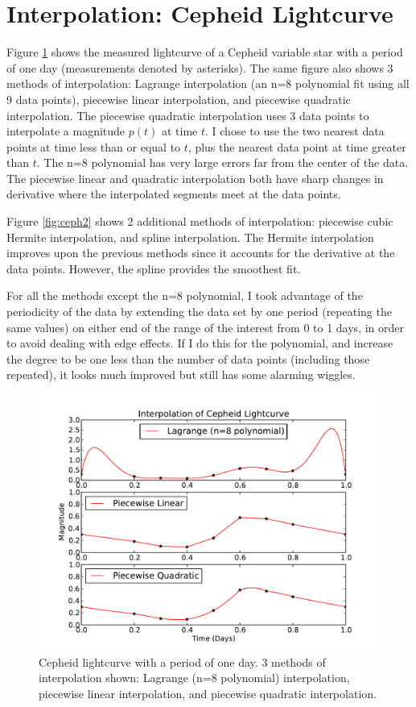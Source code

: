 \documentclass{article}
\begin{document}
\section{Interpolation: Cepheid Lightcurve}
Figure \ref{fig:ceph} shows the measured lightcurve of a Cepheid variable star with
a period of one day (measurements denoted by asterisks).  The same figure also shows
3 methods of interpolation: Lagrange interpolation (an n=8 polynomial fit using all 9
data points), piecewise linear interpolation, and piecewise quadratic interpolation.
The piecewise quadratic interpolation uses 3 data points to interpolate a magnitude $p(t)$
at time $t$.  I chose to use the two nearest data points at time less than or equal to $t$,
plus the nearest data point at time greater than $t$.  The n=8 polynomial has very large
errors far from the center of the data.  The piecewise linear and quadratic interpolation
both have sharp changes in derivative where the interpolated segments meet at the data points.

Figure \ref{fig:ceph2} shows 2 additional methods of interpolation: piecewise cubic Hermite
interpolation, and spline interpolation.  The Hermite interpolation improves upon the
previous methods since it accounts for the derivative at the data points.  However, the
spline provides the smoothest fit.

For all the methods except the n=8 polynomial, I took advantage of the periodicity of the
data by extending the data set by one period (repeating the same values) on either end of
the range of the interest from 0 to 1 days, in order to avoid dealing with edge effects.
If I do this for the polynomial, and increase the degree to be one less than the number of
data points (including those repeated), it looks much improved but still has some alarming wiggles.

\begin{figure}[h]
  \begin{center}
     \includegraphics[width=\textwidth]{ceph}
  \end{center}
  \caption{Cepheid lightcurve with a period of one day.  3 methods of interpolation
	   shown: Lagrange (n=8 polynomial) interpolation, piecewise linear interpolation,
		  and piecewise quadratic interpolation.}
  \label{fig:ceph}
\end{figure}
\end{document}
